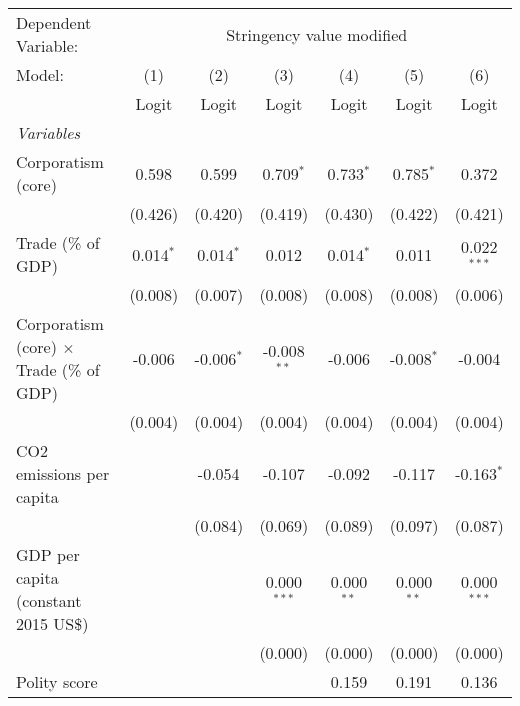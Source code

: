 
\begingroup
\centering
\begin{tabular}{lcccccc}
   \toprule
   Dependent Variable: & \multicolumn{6}{c}{Stringency value modified}\\
   Model:                                          & (1)         & (2)          & (3)           & (4)          & (5)          & (6)\\  
                                                   &  Logit      & Logit        & Logit         & Logit        & Logit        & Logit\\  
   \midrule
   \emph{Variables}\\
   Corporatism (core)                              & 0.598       & 0.599        & 0.709$^{*}$   & 0.733$^{*}$  & 0.785$^{*}$  & 0.372\\   
                                                   & (0.426)     & (0.420)      & (0.419)       & (0.430)      & (0.422)      & (0.421)\\   
   Trade (\% of GDP)                               & 0.014$^{*}$ & 0.014$^{*}$  & 0.012         & 0.014$^{*}$  & 0.011        & 0.022$^{***}$\\   
                                                   & (0.008)     & (0.007)      & (0.008)       & (0.008)      & (0.008)      & (0.006)\\   
   Corporatism (core) $\times$ Trade (\% of GDP)   & -0.006      & -0.006$^{*}$ & -0.008$^{**}$ & -0.006       & -0.008$^{*}$ & -0.004\\   
                                                   & (0.004)     & (0.004)      & (0.004)       & (0.004)      & (0.004)      & (0.004)\\   
   CO2 emissions per capita                        &             & -0.054       & -0.107        & -0.092       & -0.117       & -0.163$^{*}$\\   
                                                   &             & (0.084)      & (0.069)       & (0.089)      & (0.097)      & (0.087)\\   
   GDP per capita (constant 2015 US\$)             &             &              & 0.000$^{***}$ & 0.000$^{**}$ & 0.000$^{**}$ & 0.000$^{***}$\\   
                                                   &             &              & (0.000)       & (0.000)      & (0.000)      & (0.000)\\   
   Polity score                                    &             &              &               & 0.159        & 0.191        & 0.136\\   

\end{tabular}

